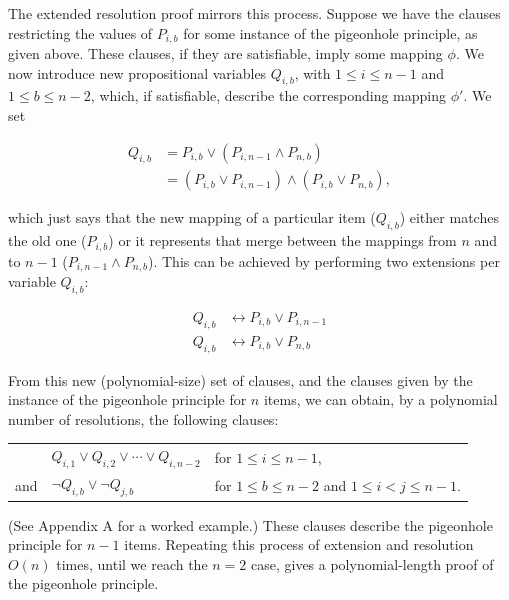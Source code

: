 \documentclass[proof,pdftex,11pt,a4,titlepage]{article}
\begin{document}
The extended resolution proof mirrors this process. Suppose we have the clauses restricting the values of $P_{i,b}$ for some instance of the pigeonhole principle, as given above. These clauses, if they are satisfiable, imply some mapping $\phi$. We now introduce new propositional variables $Q_{i,b}$, with $1 \leq i \leq n-1$ and $1 \leq b \leq n-2$, which, if satisfiable, describe the corresponding mapping $\phi'$. We set

\begin{equation*}
  \begin{align*}
    Q_{i,b} &= P_{i,b} \vee (P_{i,n-1} \wedge P_{n,b}) \\
      &= (P_{i,b} \vee P_{i,n-1}) \wedge (P_{i,b} \vee P_{n,b}),
  \end{align*}
\end{equation*}

which just says that the new mapping of a particular item ($Q_{i,b}$) either matches the old one ($P_{i,b}$) or it represents that merge between the mappings from $n$ and to $n-1$ ($P_{i,n-1} \wedge P_{n,b}$). This can be achieved by performing two extensions per variable $Q_{i,b}$:

\begin{equation*}
  \begin{align*}
    Q_{i,b} &\leftrightarrow P_{i,b} \vee P_{i,n-1} \\
    Q_{i,b} &\leftrightarrow P_{i,b} \vee P_{n,b}
  \end{align*}
\end{equation*}

From this new (polynomial-size) set of clauses, and the clauses given by the instance of the pigeonhole principle for $n$ items, we can obtain, by a polynomial number of resolutions, the following clauses:

\begin{table}[h]
  \begin{tabular}{rll}
        & $Q_{i,1} \vee Q_{i,2} \vee \cdots \vee Q_{i,n-2}$ & for $1 \leq i \leq n-1$, \\
    and & $\neg Q_{i,b} \vee \neg Q_{j,b}$ & for $1 \leq b \leq n-2$ and $1 \leq i < j \leq n-1$.
  \end{tabular}
\end{table}
\FloatBarrier

(See Appendix A for a worked example.) These clauses describe the pigeonhole principle for $n-1$ items. Repeating this process of extension and resolution $O(n)$ times, until we reach the $n=2$ case, gives a polynomial-length proof of the pigeonhole principle.
\end{document}
